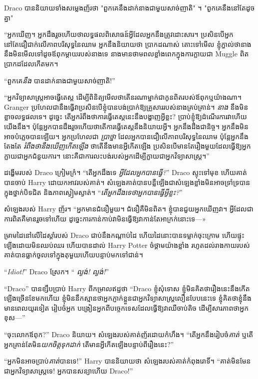{{{{{{Draco បាននិយាយទាំងសម្លេងញ័រថា "ពួកគេនឹងដាក់នាងជាមួយសាច់ញាតិ" ។ "ពួកគេនឹងនៅតែដូចគ្នា"

“អ្នកឃើញ។ អ្នកដឹងរួចហើយថាលទ្ធផលពិសោធន៍អ្វីដែលអ្នកនឹងត្រូវដោះសារ។ ប្រសិនបើអ្នកនៅតែជឿជាក់លើភាពបរិសុទ្ធនៃឈាម អ្នកនឹងនិយាយថា ប្រាកដណាស់ តោះទៅមើល ខ្ញុំភ្នាល់ថានាងនឹងមិនមើលទៅដូចឪពុកម្តាយរបស់នាងទេ នាងមានថាមពលខ្លាំងពេកក្នុងការក្លាយជា Muggle ពិតប្រាកដដែលកើតមក។

“ពួកគេ\emph{នឹង} បានដាក់នាងជាមួយសាច់ញាតិ!”

“អ្នកវិទ្យាសាស្ត្រអាចធ្វើតេស្ត ដើម្បីពិនិត្យមើលថាតើនរណាម្នាក់ជាកូនពិតរបស់ឪពុកឬយ៉ាងណា។ Granger ប្រហែលជានឹងធ្វើវាប្រសិនបើខ្ញុំបានបង់ប្រាក់ឱ្យគ្រួសាររបស់នាងគ្រប់គ្រាន់។ \emph{នាង} នឹងមិនខ្លាចលទ្ធផលទេ។ ដូច្នេះ តើអ្នករំពឹងថាការធ្វើតេស្តនេះនឹងបង្ហាញអ្វីខ្លះ? ប្រាប់ខ្ញុំឱ្យដំណើរការវាហើយយើងនឹង។ ប៉ុន្តែ​អ្នក​បាន​ដឹង​រួច​ហើយ​ថា​តើ​ការ​ធ្វើ​តេ​ស្ត​នឹង​និយាយ​អ្វី​។ អ្នកនឹងដឹងជានិច្ច។ អ្នកនឹងមិនអាចបំភ្លេចបានឡើយ។ អ្នកប្រហែលជា \emph{ប្រាថ្នា} ដែលអ្នកបានជឿលើភាពបរិសុទ្ធនៃឈាម ប៉ុន្តែអ្នកនឹងតែងតែ \emph{រំពឹងថានឹងឃើញកើតឡើង} ថាតើនឹងមានអ្វីកើតឡើង ប្រសិនបើមានតែរឿងមួយដែលធ្វើឱ្យអ្នកក្លាយជាអ្នកជំនួយការ។ នោះគឺជាការលះបង់របស់អ្នកដើម្បីក្លាយជាអ្នកវិទ្យាសាស្ត្រ។”

ដង្ហើម​របស់ Draco ក្រៀមក្រំ។ “តើអ្នកដឹងទេ \emph{អ្វីដែលអ្នកបានធ្វើ?}” Draco ស្ទុះទៅមុខ ហើយគាត់បានចាប់ Harry ដោយកអាវរបស់គាត់។ សំឡេង​គាត់​បាន​បន្លឺ​ឡើង​ជា​សំឡេង​ខ្លាំង​មិន​អាច​ទ្រាំទ្រ​បាន​ក្នុង​ថ្នាក់​បិទ​ជិត និង​ភាព​ស្ងៀមស្ងាត់។ “\emph{តើអ្នកដឹងទេថាអ្នកបានធ្វើអ្វីខ្លះ?}”

សំឡេងរបស់ Harry ញ័រ។ “អ្នកមានជំនឿមួយ។ ជំនឿគឺមិនពិត។ ខ្ញុំបានជួយអ្នកឃើញវា។ អ្វី​ដែល​ជា​ការ​ពិត​គឺ​មាន​រួច​ទៅ​ហើយ ដូច្នេះ​ការ​កាន់​កាប់​វា​មិន​ធ្វើ​ឱ្យ​វា​កាន់​តែ​អាក្រក់​នោះ​ទេ—»

ម្រាមដៃនៅលើដៃស្តាំរបស់ Draco ជាប់នឹងកណ្តាប់ដៃ ហើយដៃនោះបានទម្លាក់ចុះក្រោម ហើយផ្ទុះឡើងដោយមិនឈប់ឈរ ហើយបានដាល់ Harry Potter ចំថ្គាមយ៉ាងខ្លាំង រហូតដល់រាងកាយរបស់គាត់បានធ្លាក់ចូលទៅក្នុងតុមួយហើយបន្ទាប់មកទៅជាន់។

“\emph{Idiot!}” Draco ស្រែក។ “\emph{ ល្ងង់! ល្ងង់!}”

“Draco” បានខ្សឹបប្រាប់ Harry ពីកម្រាលឥដ្ឋថា “Draco ខ្ញុំសុំទោស ខ្ញុំមិនគិតថារឿងនេះនឹងកើតឡើងច្រើនខែមកហើយ ខ្ញុំមិននឹកស្មានថាអ្នកភ្ញាក់ខ្លួនជាអ្នកវិទ្យាសាស្ត្រលឿនបែបនេះទេ ខ្ញុំគិតថាខ្ញុំនឹងមានពេលយូរទៀត រៀបចំអ្នក បង្រៀនអ្នកពីបច្ចេកទេសដែលធ្វើឱ្យវាឈឺចាប់តិច ដើម្បីសារភាពថាអ្នកខុស—”

“ចុះលោកឪពុក?” Draco និយាយ។ សំឡេងរបស់គាត់ញ័រដោយកំហឹង។ “តើអ្នកនឹងរៀបចំ\emph{គាត់} ឬតើអ្នកគ្រាន់តែមិន\emph{យកចិត្តទុកដាក់} តើមានអ្វីកើតឡើងបន្ទាប់ពីរឿងនេះ?”

“អ្នកមិនអាចប្រាប់\emph{គាត់}បានទេ!” Harry បាននិយាយថា សំឡេងរបស់គាត់កំពុងរោទិ៍។ “គាត់មិនមែនជាអ្នកវិទ្យាសាស្ត្រទេ! អ្នកបានសន្យាហើយ Draco!”

}}}}}}
